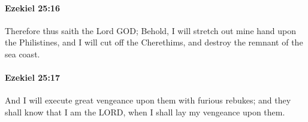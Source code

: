 		\paragraph{Ezekiel 25:16} %
			\label{EZEKIEL-25-16}

			Therefore thus saith the Lord GOD; Behold, I will stretch out mine hand upon the Philistines, and I will cut off the Cherethims, and destroy the remnant of the sea coast.


		\paragraph{Ezekiel 25:17} %
			\label{EZEKIEL-25-17}

			And I will execute great vengeance upon them with furious rebukes; and they shall know that I am the LORD, when I shall lay my vengeance upon them.

